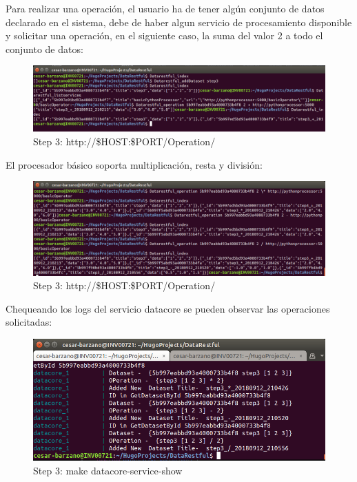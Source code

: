 \documentclass[a4paper,11pt]{book}
\begin{document}
Para realizar una operación, el usuario ha de tener algún conjunto de datos declarado en el sistema, debe de haber algun servicio de procesamiento disponible y solicitar una operación, en el siguiente caso, la suma del valor 2 a todo el conjunto de datos:

\begin{figure}[H]  
\centering 
\includegraphics[scale=0.35]{imagenes/ope.png}
\caption{ Step 3: http://\$HOST:\$PORT/Operation/ }  
\end{figure}

El procesador básico soporta multiplicación, resta y división:

\begin{figure}[H]  
\centering 
\includegraphics[scale=0.35]{imagenes/ope2.png}
\caption{ Step 3: http://\$HOST:\$PORT/Operation/ }  
\end{figure}

Chequeando los logs del servicio datacore se pueden observar las operaciones solicitadas: 

\begin{figure}[H]  
\centering 
\includegraphics[scale=0.35]{imagenes/ope3.png}
\caption{ Step 3: make datacore-service-show }  
\end{figure}
\end{document}
